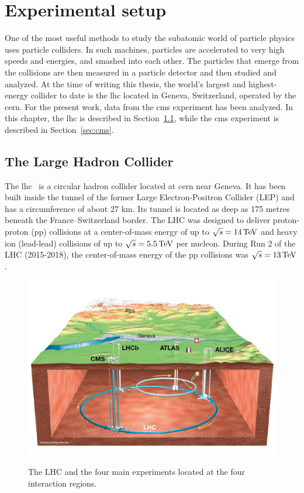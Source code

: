 \chapter{Experimental setup}

One of the most useful methods to study the subatomic world of particle physics uses particle colliders. In such machines, particles are accelerated to very high speeds and energies, and smashed into each other. The particles that emerge from the collisions are then measured in a particle detector and then studied and analyzed. At the time of writing this thesis, the world's largest and highest-energy collider to date is the \gls{lhc} located in Geneva, Switzerland, operated by the \gls{cern}. For the present work, data from the \gls{cms} experiment has been analyzed. In this chapter, the \gls{lhc} is described in Section~\ref{sec:lhc}, while the \gls{cms} experiment is described in Section~\ref{sec:cms}. 

\section{The Large Hadron Collider}
\label{sec:lhc}

The \gls{lhc}~\cite{Bruning:2004ej, Buning:2004wk,Benedikt:2004wm} is a circular hadron collider located at \gls{cern} near Geneva. It has been built inside the tunnel of the former Large Electron-Positron Collider (LEP) and has a circumference of about 27 km. Its tunnel is located as deep as 175 metres beneath the France–Switzerland border. The LHC was designed to deliver proton-proton (pp) collisions at a center-of-mass energy of up to $\sqrt{s} = 14\,\text{Te\hspace{-.08em}V}$ and heavy ion (lead-lead) collisions of up to $\sqrt{s} = 5.5\,\text{Te\hspace{-.08em}V}$ per nucleon. During Run 2 of the LHC (2015-2018), the center-of-mass energy of the pp collisions was $\sqrt{s} = 13\,\text{Te\hspace{-.08em}V}$.

\begin{figure}[!htb]
\centering
\includegraphics[width=0.75\linewidth]{plots/detector/LHC_overview.png}  \\
\caption[LHC overview]{The LHC and the four main experiments located at the four interaction regions.}
\label{fig:lhc-overview}
\end{figure}

